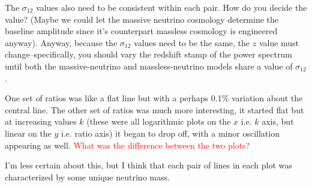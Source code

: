 \documentclass[11pt]{article}
\begin{document}
The $\sigma_{12}$ values also need to be consistent within each pair. How do you decide the value? (Maybe we could let the massive neutrino cosmology determine the baseline amplitude since it's counterpart massless cosmology is engineered anyway). Anyway, because the $\sigma_{12}$ values need to be the same, the $z$ value must change--specifically, you should vary the redshift stamp of the power spectrum until both the massive-neutrino and massless-neutrino models share a value of $\sigma_{12}$.

One set of ratios was like a flat line but with a perhaps 0.1\% variation about the central line. The other set of ratios was much more interesting, it started flat but at increasing values $k$ (these were all logarithmic plots on the $x$ i.e. $k$ axis, but linear on the $y$ i.e. ratio axis) it began to drop off, with a minor oscillation appearing as well. \textcolor{red}{What was the difference between the two plots?}

I'm less certain about this, but I think that each pair of lines in each plot was characterized by some unique neutrino mass.



\end{document}
